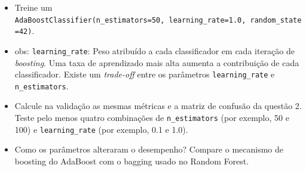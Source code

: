 \documentclass[11pt]{article}
\begin{document}
\begin{itemize}
\item
  Treine um
  \texttt{AdaBoostClassifier(n\_estimators=50,\ learning\_rate=1.0,\ random\_state=42)}.
\item
  obs: \texttt{learning\_rate}: Peso atribuído a cada classificador em
  cada iteração de \emph{boosting}. Uma taxa de aprendizado mais alta
  aumenta a contribuição de cada classificador. Existe um
  \emph{trade-off} entre os parâmetros \texttt{learning\_rate} e
  \texttt{n\_estimators}.
\item
  Calcule na validação as mesmas métricas e a matriz de confusão da
  questão 2. Teste pelo menos quatro combinações de
  \texttt{n\_estimators} (por exemplo, 50 e 100) e
  \texttt{learning\_rate} (por exemplo, 0.1 e 1.0).
\item
  Como os parâmetros alteraram o desempenho? Compare o mecanismo de
  boosting do AdaBoost com o bagging usado no Random Forest.
\end{itemize}
\end{document}

